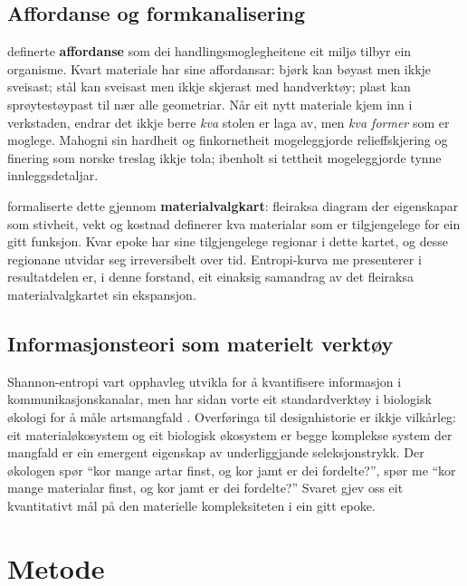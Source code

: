 \documentclass[10pt, a4paper, twocolumn]{article}
\begin{document}
\subsection{Affordanse og formkanalisering}

\citet{gibson1977} definerte \textbf{affordanse} som dei handlingsmoglegheitene eit miljø tilbyr ein organisme. Kvart materiale har sine affordansar: bjørk kan bøyast men ikkje sveisast; stål kan sveisast men ikkje skjerast med handverktøy; plast kan sprøytestøypast til nær alle geometriar. Når eit nytt materiale kjem inn i verkstaden, endrar det ikkje berre \emph{kva} stolen er laga av, men \emph{kva former} som er moglege. Mahogni sin hardheit og finkornetheit mogeleggjorde relieffskjering og finering som norske treslag ikkje tola; ibenholt si tettheit mogeleggjorde tynne innleggsdetaljar.

\citet{ashby2013} formaliserte dette gjennom \textbf{materialvalgkart}: fleiraksa diagram der eigenskapar som stivheit, vekt og kostnad definerer kva materialar som er tilgjengelege for ein gitt funksjon. Kvar epoke har sine tilgjengelege regionar i dette kartet, og desse regionane utvidar seg irreversibelt over tid. Entropi-kurva me presenterer i resultatdelen er, i denne forstand, eit einaksig samandrag av det fleiraksa materialvalgkartet sin ekspansjon.

\subsection{Informasjonsteori som materielt verktøy}

Shannon-entropi \citep{shannon1948} vart opphavleg utvikla for å kvantifisere informasjon i kommunikasjonskanalar, men har sidan vorte eit standardverktøy i biologisk økologi for å måle artsmangfald \citep{magurran2004}. Overføringa til designhistorie er ikkje vilkårleg: eit materialøkosystem og eit biologisk økosystem er begge komplekse system der mangfald er ein emergent eigenskap av underliggjande seleksjonstrykk. Der økologen spør ``kor mange artar finst, og kor jamt er dei fordelte?'', spør me ``kor mange materialar finst, og kor jamt er dei fordelte?'' Svaret gjev oss eit kvantitativt mål på den materielle kompleksiteten i ein gitt epoke.


\section{Metode}
\end{document}
